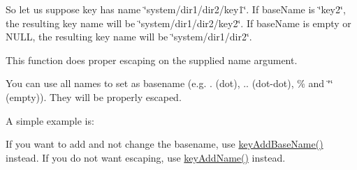 So let us suppose {\ttfamily key} has name {\ttfamily \char`\"{}system/dir1/dir2/key1\char`\"{}}. If {\ttfamily base\-Name} is {\ttfamily \char`\"{}key2\char`\"{}}, the resulting key name will be {\ttfamily \char`\"{}system/dir1/dir2/key2\char`\"{}}. If {\ttfamily base\-Name} is empty or N\-U\-L\-L, the resulting key name will be {\ttfamily \char`\"{}system/dir1/dir2\char`\"{}}.

This function does proper escaping on the supplied name argument.

You can use all names to set as basename (e.\-g. . (dot), .. (dot-\/dot), \% and \char`\"{}\char`\"{} (empty)). They will be properly escaped.

A simple example is\-: 
 If you want to add and not change the basename, use \hyperlink{group__keyname_gaa942091fc4bd5c2699e49ddc50829524}{key\-Add\-Base\-Name()} instead. If you do not want escaping, use \hyperlink{group__keyname_gaa70593a2c772c4b7bc33423b9b10a270}{key\-Add\-Name()} instead.

